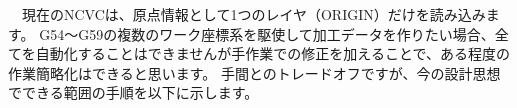 

\vspace*{1zh}
　現在のNCVCは、原点情報として1つのレイヤ（ORIGIN）だけを読み込みます。
G54～G59の複数のワーク座標系を駆使して加工データを作りたい場合、全てを自動化することはできませんが手作業での修正を加えることで、ある程度の作業簡略化はできると思います。
手間とのトレードオフですが、今の設計思想でできる範囲の手順を以下に示します。
